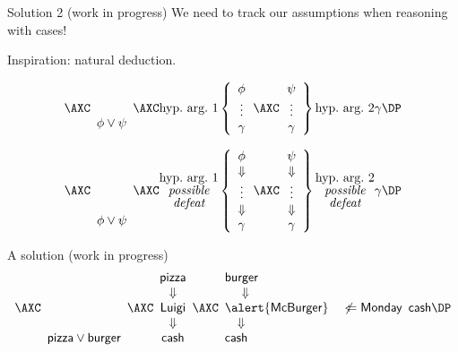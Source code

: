 \documentclass[aspectratio=169]{beamer}
\begin{document}
\begin{frame}[label={sec:org6b86e0c}]{Solution 2 (work in progress)}
We need to track our assumptions when reasoning with cases!

Inspiration: \alert{natural deduction}.

\vspace{-.5cm}

\[
\axs{\array{c} \phantom{M} \\ \phantom{M} \\ \phi \vee \psi \endarray}
\axs{\mbox{hyp.~arg.~1} \left\{ \array{c} \phi \\ \vdots \\ \gamma \endarray \right.}
\axs{\left. \array{c} \psi \\ \vdots \\ \gamma \endarray \right\} \mbox{hyp.~arg.~2} }
\irl3{RbC}{\gamma}
\DP
\]

\pause

\[
\axs{\array{c} \phantom{M} \\ \phantom{M} \\ \phantom{M} \\ \phantom{M} \\ \phi \vee \psi \endarray}
\axs{\substack{\mbox{hyp.~arg.~1} \\ \mbox{\it possible} \\ \mbox{\it defeat}} \left\{ \array{c} \phi \\ \Downarrow \\ \vdots \\ \Downarrow \\ \gamma \endarray \right.}
\axs{\left. \array{c} \psi \\ \Downarrow \\ \vdots \\ \Downarrow \\ \gamma \endarray \right\} \substack{\mbox{hyp.~arg.~2} \\ \mbox{\it possible} \\ \mbox{\it defeat}} }
\irl3{(defeasible) RbC}{\gamma}
\DP
\]
\end{frame}
\begin{frame}[label={sec:org0c5900f}]{A solution (work in progress)}
\[
\axs{\array{c} \phantom{M} \\ \phantom{M} \\ \phantom{M} \\ \phantom{M} \\ \mathsf{pizza} \vee \mathsf{burger} \endarray}
\axs{\array{c} \mathsf{pizza} \\ \Downarrow \\ \mathsf{Luigi} \\ \Downarrow \\ \mathsf{cash} \endarray}
\axs{\array{l} \mathsf{burger} \\ ~~~~\Downarrow \\ \alert{\mathsf{McBurger}} \quad \not\Leftarrow \mathsf{Monday} \\ ~~~\Downarrow \\ \mathsf{cash} \endarray}
\irl3{RbC}{\mathsf{cash}}
\DP
\]
\end{frame}
\end{document}
